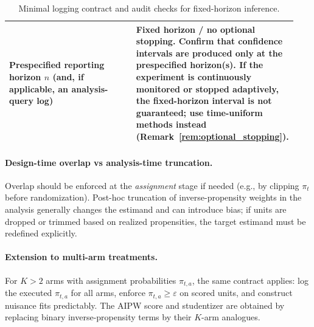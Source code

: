 \documentclass[11pt]{article}
\numberwithin{equation}{section}
\theoremstyle{plain}
\theoremstyle{definition}
\theoremstyle{remark}
\begin{document}
\begin{table}[t]
\begin{tabular}{@{}p{0.46\linewidth} p{0.48\linewidth}@{}}
Prespecified reporting horizon $n$ (and, if applicable, an analysis-query log) &
\textbf{Fixed horizon / no optional stopping.} Confirm that confidence intervals are produced only at the prespecified horizon(s). If the experiment is continuously monitored or stopped adaptively, the fixed-horizon interval is not guaranteed; use time-uniform methods instead (Remark~\ref{rem:optional_stopping}). \\
\bottomrule
\end{tabular}
\caption{Minimal logging contract and audit checks for fixed-horizon inference.}\label{tab:data_contract}
\end{table}

\paragraph{Design-time overlap vs analysis-time truncation.}
Overlap should be enforced at the \emph{assignment} stage if needed (e.g., by clipping $\pi_t$ before randomization). Post-hoc truncation of inverse-propensity weights in the analysis generally changes the estimand and can introduce bias; if units are dropped or trimmed based on realized propensities, the target estimand must be redefined explicitly.

\paragraph{Extension to multi-arm treatments.}
For $K>2$ arms with assignment probabilities $\pi_{t,a}$, the same contract applies: log the executed $\pi_{t,a}$ for all arms, enforce $\pi_{t,a}\ge \varepsilon$ on scored units, and construct nuisance fits predictably. The AIPW score and studentizer are obtained by replacing binary inverse-propensity terms by their $K$-arm analogues.

\end{document}
